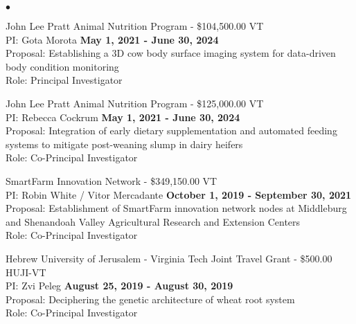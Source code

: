 \documentclass[margin,line,10pt]{res}
\newenvironment{list2}{
  \begin{list}{$\bullet$}{%
      \setlength{\itemsep}{0in}
      \setlength{\parsep}{0in} \setlength{\parskip}{0in}
      \setlength{\topsep}{0in} \setlength{\partopsep}{0in} 
      \setlength{\leftmargin}{0.2in}}}{\end{list}}
\begin{document}
\begin{resume}
\begin{list2}
\vspace{0.5cm}

\item John Lee Pratt Animal Nutrition Program - \$104,500.00  \hfill VT\\
PI: Gota Morota \hfill \textbf{May 1, 2021 - June 30, 2024}\\
Proposal: Establishing a 3D cow body surface imaging system for data-driven body condition monitoring\\
Role: Principal Investigator \\


\vspace{0.5cm}


\item John Lee Pratt Animal Nutrition Program - \$125,000.00  \hfill VT\\
PI: Rebecca Cockrum \hfill \textbf{May 1, 2021 - June 30, 2024}\\
Proposal: Integration of early dietary supplementation and automated feeding systems to mitigate post-weaning slump in dairy heifers\\
Role: Co-Principal Investigator \\

\vspace{0.5cm}


\item SmartFarm Innovation Network - \$349,150.00  \hfill VT\\
PI: Robin White / Vitor Mercadante  \hfill \textbf{October 1, 2019 - September 30, 2021}\\
Proposal: Establishment of SmartFarm innovation network nodes at Middleburg and Shenandoah Valley Agricultural Research and Extension Centers \\
Role: Co-Principal Investigator \\

\vspace{0.5cm}


\item  Hebrew University of Jerusalem - Virginia Tech Joint Travel Grant - \$500.00  \hfill HUJI-VT\\
PI: Zvi Peleg  \hfill \textbf{August 25, 2019 - August 30, 2019}\\
Proposal: Deciphering the genetic architecture of wheat root system \\
Role: Co-Principal Investigator \\


\vspace{0.5cm}




\end{list2}
\end{resume}
\end{document}
